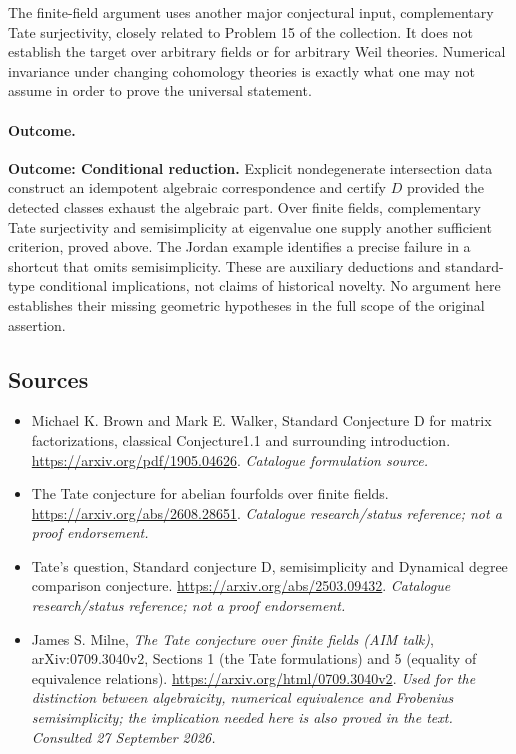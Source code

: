 \documentclass[11pt,a4paper]{article}
\numberwithin{equation}{section}
\begin{document}
The finite-field argument uses another major conjectural input,
complementary Tate surjectivity, closely related to Problem 15 of the
collection. It does not establish the target over arbitrary fields or
for arbitrary Weil theories. Numerical invariance under changing
cohomology theories is exactly what one may not assume in order to
prove the universal statement.

\paragraph{Outcome.}
\textbf{Outcome: Conditional reduction.}
Explicit nondegenerate intersection data construct an idempotent algebraic
correspondence and certify $D$ provided the detected classes exhaust the
algebraic part. Over finite fields, complementary Tate surjectivity and
semisimplicity at eigenvalue one supply another sufficient criterion,
proved above. The Jordan example identifies a precise failure in a
shortcut that omits semisimplicity. These are auxiliary deductions and
standard-type conditional implications, not claims of historical novelty.
No argument here establishes their missing geometric hypotheses in the
full scope of the original assertion.
\subsection{Sources}
\begin{itemize}\raggedright
\item[\textnormal{[S1]}]\hypertarget{source:44:1}{} Michael K. Brown and Mark E. Walker, Standard Conjecture D for matrix factorizations, classical Conjecture1.1 and surrounding introduction.
\url{https://arxiv.org/pdf/1905.04626}.
{\small\textit{Catalogue formulation source.}}
\item[\textnormal{[S2]}]\hypertarget{source:44:2}{} The Tate conjecture for abelian fourfolds over finite fields.
\url{https://arxiv.org/abs/2608.28651}.
{\small\textit{Catalogue research/status reference; not a proof endorsement.}}
\item[\textnormal{[S3]}]\hypertarget{source:44:3}{} Tate's question, Standard conjecture D, semisimplicity and Dynamical degree comparison conjecture.
\url{https://arxiv.org/abs/2503.09432}.
{\small\textit{Catalogue research/status reference; not a proof endorsement.}}
\item[\textnormal{[E1]}]\hypertarget{extra:44:1}{} James S. Milne,
\emph{The Tate conjecture over finite fields (AIM talk)}, arXiv:0709.3040v2,
Sections 1 (the Tate formulations) and 5 (equality of equivalence relations).
\url{https://arxiv.org/html/0709.3040v2}.
{\small\textit{Used for the distinction between algebraicity, numerical equivalence and Frobenius semisimplicity; the implication needed here is also proved in the text. Consulted 27 September 2026.}}
\end{itemize}
\end{document}
